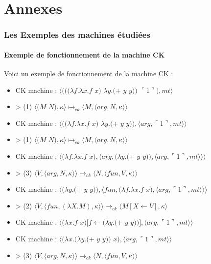 \documentclass[10pt,a4paper]{report}
\begin{document}
\chapter*{Annexes}

\subsection*{Les Exemples des machines étudiées}

\subsubsection{Exemple de fonctionnement de la machine CK}\label{CK}

Voici un exemple de fonctionnement de la machine CK :

\begin{itemize}
\item[] CK machine : $\langle(((\lambda f.\lambda x.f$ $x)$ $\lambda y.(+$ $y$ $y))$ $\ulcorner 1\urcorner),mt\rangle$
\item[] > (1) $\langle(M$ $N),\kappa\rangle \longmapsto_{ck} \langle M,\langle arg,N,\kappa\rangle\rangle$
\item[] CK machine : $\langle((\lambda f.\lambda x.f$ $x)$ $\lambda y.(+$ $y$ $y)),\langle arg,\ulcorner 1\urcorner,mt\rangle\rangle$
\item[] > (1) $\langle(M$ $N),\kappa\rangle \longmapsto_{ck} \langle M,\langle arg,N,\kappa\rangle\rangle$
\item[] CK machine : $\langle(\lambda f.\lambda x.f$ $x),\langle arg,(\lambda y.(+$ $y$ $y)),\langle arg,\ulcorner 1\urcorner,mt\rangle\rangle\rangle$	
\item[] > (3) $\langle V,\langle arg,N,\kappa \rangle \rangle \longmapsto_{ck} \langle N,\langle fun,V,\kappa \rangle \rangle$
\item[] CK machine : $\langle(\lambda y.(+$ $y$ $y)),\langle fun,(\lambda f.\lambda x.f$ $x),\langle arg,\ulcorner 1\urcorner,mt\rangle\rangle\rangle$	
\item[] > (2) $\langle V,\langle fun,(\lambda X.M),\kappa \rangle \rangle \longmapsto_{ck} \langle M[X \leftarrow V],\kappa\rangle$
\item[] CK machine : $\langle(\lambda x.f$ $x)[f\leftarrow(\lambda y.(+$ $y$ $y))],\langle arg,\ulcorner 1\urcorner,mt\rangle\rangle$	
\item[] CK machine : $\langle(\lambda x.(\lambda y.(+$ $y$ $y))$ $x),\langle arg,\ulcorner 1\urcorner,mt\rangle\rangle$	
\item[] > (3) $\langle V,\langle arg,N,\kappa \rangle \rangle \longmapsto_{ck} \langle N,\langle fun,V,\kappa \rangle \rangle$

\end{itemize}
\end{document}
